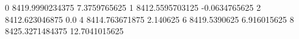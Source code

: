 0 8419.9990234375 7.3759765625
1 8412.5595703125 -0.0634765625
2 8412.623046875 0.0
4 8414.763671875 2.140625
6 8419.5390625 6.916015625
8 8425.3271484375 12.7041015625
